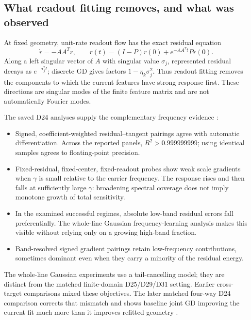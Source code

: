 \documentclass[11pt]{article}
\begin{document}
\subsection{What readout fitting removes, and what was observed}

At fixed geometry, unit-rate readout flow has the exact residual equation
\begin{equation}
 \dot r=-AA^Tr,\qquad
 r(t)=(I-P)r(0)+e^{-AA^Tt}Pr(0).
 \label{eq:readout-flow}
\end{equation}
Along a left singular vector of $A$ with singular value $\sigma_j$, represented residual decays as $e^{-\sigma_j^2t}$; discrete GD gives factors $1-\eta_k\sigma_j^2$. Thus readout fitting removes the components to which the current features have strong response first. These directions are singular modes of the finite feature matrix and are not automatically Fourier modes.

The saved D24 analyses supply the complementary frequency evidence \cite{ledger,catalogue}:
\begin{itemize}
\item Signed, coefficient-weighted residual--tangent pairings agree with automatic differentiation. Across the reported panels, $R^2>0.999999999$; using identical samples agrees to floating-point precision.
\item Fixed-residual, fixed-center, fixed-readout probes show weak scale gradients when $\gamma$ is small relative to the carrier frequency. The response rises and then falls at sufficiently large $\gamma$: broadening spectral coverage does not imply monotone growth of total sensitivity.
\item In the examined successful regimes, absolute low-band residual errors fall preferentially. The whole-line Gaussian frequency-learning analysis makes this visible without relying only on a growing high-band fraction.
\item Band-resolved signed gradient pairings retain low-frequency contributions, sometimes dominant even when they carry a minority of the residual energy.
\end{itemize}
The whole-line Gaussian experiments use a tail-cancelling model; they are distinct from the matched finite-domain D25/D29/D31 setting. Earlier cross-target comparisons mixed these objectives. The later matched four-way D24 comparison corrects that mismatch and shows baseline joint GD improving the current fit much more than it improves refitted geometry \cite{catalogue,ledger}.
\end{document}
